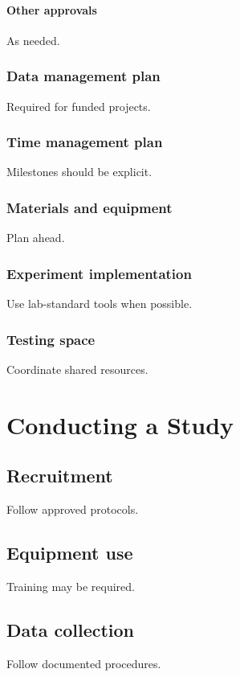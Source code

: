 \documentclass[11pt]{article}
\begin{document}
\paragraph{Other approvals}
As needed.

\subsubsection{Data management plan}
Required for funded projects.

\subsubsection{Time management plan}
Milestones should be explicit.

\subsubsection{Materials and equipment}
Plan ahead.

\subsubsection{Experiment implementation}
Use lab-standard tools when possible.

\subsubsection{Testing space}
Coordinate shared resources.

\section{Conducting a Study}

\subsection{Recruitment}
Follow approved protocols.

\subsection{Equipment use}
Training may be required.

\subsection{Data collection}
Follow documented procedures.
\end{document}
